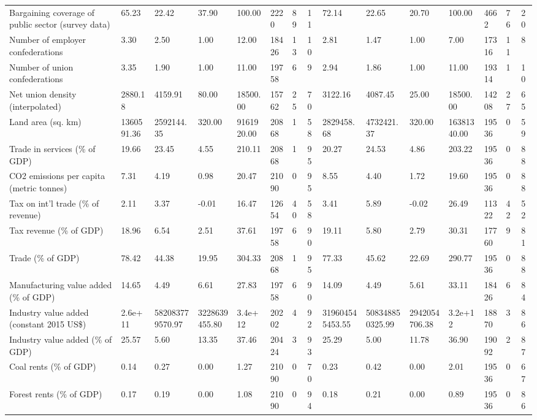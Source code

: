 \begin{longtable}{lllllllllllllll}
\addlinespace
Bargaining coverage of public sector (survey data) & 65.23 & 22.42 & 37.90 & 100.00 & 2220 & 89 & 11 & 72.14 & 22.65 & 20.70 & 100.00 & 4662 & 76 & 20\\
Number of employer confederations & 3.30 & 2.50 & 1.00 & 12.00 & 18426 & 13 & 10 & 2.81 & 1.47 & 1.00 & 7.00 & 17316 & 11 & 8\\
Number of union confederations & 3.35 & 1.90 & 1.00 & 11.00 & 19758 & 6 & 9 & 2.94 & 1.86 & 1.00 & 11.00 & 19314 & 1 & 10\\
Net union density (interpolated) & 2880.18 & 4159.91 & 80.00 & 18500.00 & 15762 & 25 & 70 & 3122.16 & 4087.45 & 25.00 & 18500.00 & 14208 & 27 & 65\\
Land area (sq. km) & 1360591.36 & 2592144.35 & 320.00 & 9161920.00 & 20868 & 1 & 58 & 2829458.68 & 4732421.37 & 320.00 & 16381340.00 & 19536 & 0 & 59\\
\addlinespace
Trade in services (\% of GDP) & 19.66 & 23.45 & 4.55 & 210.11 & 20868 & 1 & 95 & 20.27 & 24.53 & 4.86 & 203.22 & 19536 & 0 & 88\\
CO2 emissions per capita (metric tonnes) & 7.31 & 4.19 & 0.98 & 20.47 & 21090 & 0 & 95 & 8.55 & 4.40 & 1.72 & 19.60 & 19536 & 0 & 88\\
Tax on int'l trade (\% of revenue) & 2.11 & 3.37 & -0.01 & 16.47 & 12654 & 40 & 58 & 3.41 & 5.89 & -0.02 & 26.49 & 11322 & 42 & 52\\
Tax revenue (\% of GDP) & 18.96 & 6.54 & 2.51 & 37.61 & 19758 & 6 & 90 & 19.11 & 5.80 & 2.79 & 30.31 & 17760 & 9 & 81\\
Trade (\% of GDP) & 78.42 & 44.38 & 19.95 & 304.33 & 20868 & 1 & 95 & 77.33 & 45.62 & 22.69 & 290.77 & 19536 & 0 & 88\\
\addlinespace
Manufacturing value added (\% of GDP) & 14.65 & 4.49 & 6.61 & 27.83 & 19758 & 6 & 90 & 14.09 & 4.49 & 5.61 & 33.11 & 18426 & 6 & 84\\
Industry value added (constant 2015 US\$) & 2.6e+11 & 582083779570.97 & 3228639455.80 & 3.4e+12 & 20202 & 4 & 92 & 319604545453.55 & 508348850325.99 & 2942054706.38 & 3.2e+12 & 18870 & 3 & 86\\
Industry value added (\% of GDP) & 25.57 & 5.60 & 13.35 & 37.46 & 20424 & 3 & 93 & 25.29 & 5.00 & 11.78 & 36.90 & 19092 & 2 & 87\\
Coal rents (\% of GDP) & 0.14 & 0.27 & 0.00 & 1.27 & 21090 & 0 & 70 & 0.23 & 0.42 & 0.00 & 2.01 & 19536 & 0 & 67\\
Forest rents (\% of GDP) & 0.17 & 0.19 & 0.00 & 1.08 & 21090 & 0 & 94 & 0.18 & 0.21 & 0.00 & 0.89 & 19536 & 0 & 86\\

\end{longtable}
